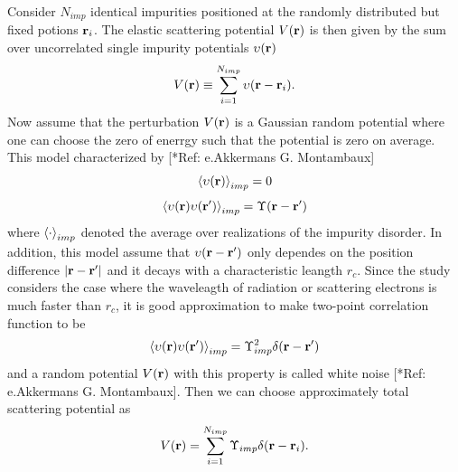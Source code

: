 \noindent
Consider $N_{imp}$ identical impurities positioned at the randomly distributed but fixed potions $\mathbf{r}_i$. The elastic scattering potential $V(\mathbf{r})$ is then given by the sum over uncorrelated single impurity potentials $\upsilon(\mathbf{r})$
\begin{equation} \label{4.26}
  V(\mathbf{r}) \equiv
  \sum_{i=1}^{N_{imp}}
  \upsilon (\mathbf{r}-\mathbf{r}_i).
\end{equation}
Now assume that the perturbation $V(\mathbf{r})$ is a Gaussian random potential where one can choose the zero of enerrgy such that the potential is zero on average. This model characterized by [*Ref: e.Akkermans G. Montambaux]
\begin{equation} \label{4.27}
  \expval{\upsilon(\mathbf{r})}_{imp} =0
\end{equation}
\begin{equation} \label{4.28}
  \expval{\upsilon(\mathbf{r})\upsilon(\mathbf{r'})}_{imp} = \Upsilon(\mathbf{r}-\mathbf{r'})
\end{equation}
where $\expval{\cdot}_{imp}$ denoted the average over realizations of the impurity disorder. In addition, this model assume that $\upsilon (\mathbf{r}-\mathbf{r'})$ only dependes on the position difference $|\mathbf{r}-\mathbf{r'}|$ and it decays with a characteristic leangth $r_c$. Since the study considers the case where the waveleagth of radiation or scattering electrons is much faster than $r_c$, it is good approximation to make two-point correlation function to be
\begin{equation} \label{4.29}
  \expval{\upsilon(\mathbf{r})\upsilon(\mathbf{r'})}_{imp} = \Upsilon_{imp}^2\delta(\mathbf{r}-\mathbf{r'})
\end{equation}
and a random potential $V(\mathbf{r})$ with this property is called white noise [*Ref: e.Akkermans G. Montambaux]. Then we can choose approximately total scattering potential as
\begin{equation} \label{4.30}
  V(\mathbf{r}) =
  \sum_{i=1}^{N_{imp}}
  \Upsilon_{imp} \delta(\mathbf{r}-\mathbf{r}_i).
\end{equation}

